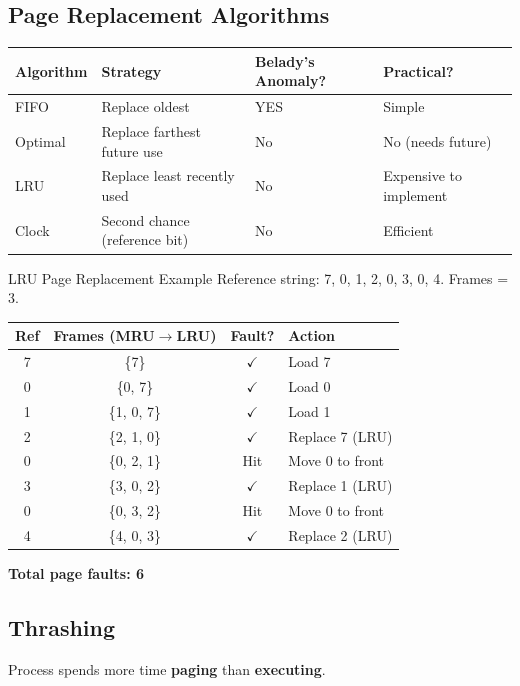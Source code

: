 \documentclass[12pt,a4paper]{article}
\begin{document}
\subsection{Page Replacement Algorithms}

\begin{center}
\begin{tabular}{@{} l l l l @{}}
\toprule
\textbf{Algorithm} & \textbf{Strategy} & \textbf{Belady's Anomaly?} & \textbf{Practical?} \\
\midrule
FIFO & Replace oldest & YES & Simple \\
Optimal & Replace farthest future use & No & No (needs future) \\
LRU & Replace least recently used & No & Expensive to implement \\
Clock & Second chance (reference bit) & No & Efficient \\
\bottomrule
\end{tabular}
\end{center}

\begin{examplebox}{LRU Page Replacement Example}
Reference string: 7, 0, 1, 2, 0, 3, 0, 4. \quad Frames = 3.

\begin{center}
\begin{tabular}{@{} c c c l @{}}
\toprule
\textbf{Ref} & \textbf{Frames (MRU$\rightarrow$LRU)} & \textbf{Fault?} & \textbf{Action} \\
\midrule
7 & \{7\} & $\checkmark$ & Load 7 \\
0 & \{0, 7\} & $\checkmark$ & Load 0 \\
1 & \{1, 0, 7\} & $\checkmark$ & Load 1 \\
2 & \{2, 1, 0\} & $\checkmark$ & Replace 7 (LRU) \\
0 & \{0, 2, 1\} & Hit & Move 0 to front \\
3 & \{3, 0, 2\} & $\checkmark$ & Replace 1 (LRU) \\
0 & \{0, 3, 2\} & Hit & Move 0 to front \\
4 & \{4, 0, 3\} & $\checkmark$ & Replace 2 (LRU) \\
\bottomrule
\end{tabular}
\end{center}
\textbf{Total page faults: 6}
\end{examplebox}

\subsection{Thrashing}
Process spends more time \textbf{paging} than \textbf{executing}.
\end{document}
